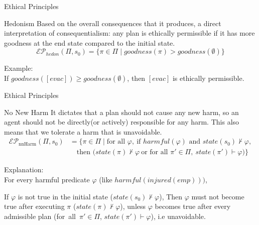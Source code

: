 \documentclass[compress,xcolor=table]{beamer}
\begin{document}
\begin{frame}{Ethical Principles}
    \small
    \begin{block}{Hedonism}
        Based on the overall consequences that it produces, a direct interpretation of consequentialism: any
        plan is ethically permissible if it has more goodness at the
        end state compared to the initial state.
        $$
        \mathcal{E}\mathcal{P}_{hedon}(\Pi, s_0) =
        \{ \pi \in \Pi \mid goodness(\pi) > goodness(\emptyset)\}
        $$
    \end{block}
    \pause
    Example: \\
    If $goodness([evac]) \geq goodness(\emptyset)$, then $[evac]$ is ethically permissible.
\end{frame}

\begin{frame}{Ethical Principles}
    \small
    \begin{block}{No New Harm}
    It dictates that a plan should not cause any new harm, so an agent should not
    be directly(or actively) responsible for any harm. This also means that we tolerate 
    a harm that is unavoidable.       
    $$
    \begin{aligned}
    \mathcal{E}\mathcal{P}_{\text{nnHarm}}(\Pi, s_0)
    &= \{ \pi \in \Pi \mid \text{for all } \varphi,\ 
    \text{if } harmful(\varphi) \text{ and } state(s_0) \not\vdash \varphi, \\
    &\quad \text{then } \big(
        state(\pi) \not\vdash \varphi
        \ \text{or for all } \pi' \in \Pi,\ 
        state(\pi') \vdash \varphi
    \big) \}
    \end{aligned}
    $$

    \end{block}
    \pause
    Explanation:\\
    For every harmful predicate $\varphi$ (like $harmful(injured(emp)))$,

If $\varphi$ is not true in the initial state ($state(s_0) \not\vdash \varphi$),
Then $\varphi$ must not become true after executing $\pi$ ($state(\pi) \not\vdash \varphi$),
unless $\varphi$ becomes true after every admissible plan (for all $\pi' \in \Pi$, $state(\pi') \vdash \varphi$), i.e unavoidable.

\end{frame}
\end{document}
